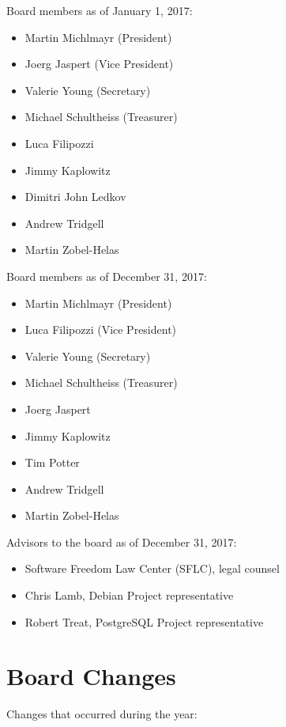 \documentclass[a4paper]{report}
\begin{document}
Board members as of January 1, 2017:

\begin{itemize}
\item Martin Michlmayr (President)
\item Joerg Jaspert (Vice President)
\item Valerie Young (Secretary)
\item Michael Schultheiss (Treasurer)
\item Luca Filipozzi
\item Jimmy Kaplowitz
\item Dimitri John Ledkov
\item Andrew Tridgell
\item Martin Zobel-Helas
\end{itemize}

Board members as of December 31, 2017:

\begin{itemize}
\item Martin Michlmayr (President)
\item Luca Filipozzi (Vice President)
\item Valerie Young (Secretary)
\item Michael Schultheiss (Treasurer)
\item Joerg Jaspert
\item Jimmy Kaplowitz
\item Tim Potter
\item Andrew Tridgell
\item Martin Zobel-Helas
\end{itemize}

Advisors to the board as of December 31, 2017:

\begin{itemize}
\item Software Freedom Law Center (SFLC), legal counsel
\item Chris Lamb, Debian Project representative
\item Robert Treat, PostgreSQL Project representative
\end{itemize}

\section{Board Changes}

Changes that occurred during the year:
\end{document}
